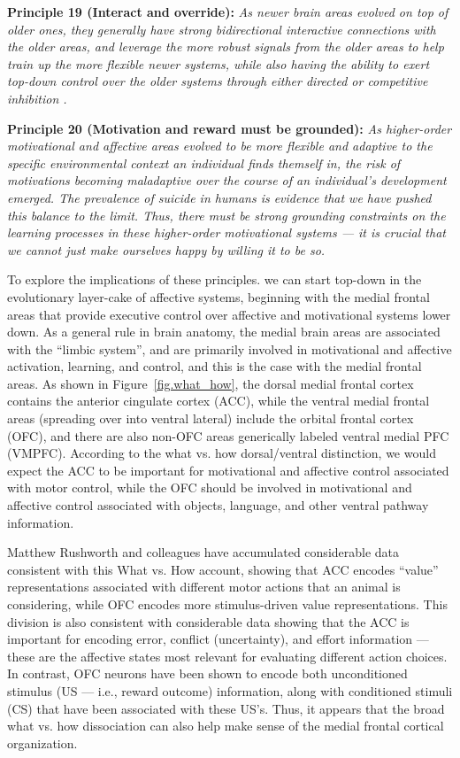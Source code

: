 \documentclass[11pt,twoside]{article}
\begin{document}
{\bf Principle 19 (Interact and override):} {\em As newer brain areas evolved
  on top of older ones, they generally have strong bidirectional interactive
  connections with the older areas, and leverage the more robust signals from
  the older areas to help train up the more flexible newer systems, while also
  having the ability to exert top-down control over the older systems through
  either directed or competitive inhibition \cite{MunakataHerdChathamEtAl11}.}

{\bf Principle 20 (Motivation and reward must be grounded):} {\em As
  higher-order motivational and affective areas evolved to be more flexible
  and adaptive to the specific environmental context an individual finds
  themself in, the risk of motivations becoming maladaptive over the course of
  an individual's development emerged.  The prevalence of suicide in humans is
  evidence that we have pushed this balance to the limit.  Thus, there must be
  strong grounding constraints on the learning processes in these higher-order
  motivational systems --- it is crucial that we cannot just make ourselves
  happy by willing it to be so.}

To explore the implications of these principles. we can start top-down in the
evolutionary layer-cake of affective systems, beginning with the medial
frontal areas that provide executive control over affective and motivational
systems lower down.  As a general rule in brain anatomy, the medial brain
areas are associated with the ``limbic system'', and are primarily involved in
motivational and affective activation, learning, and control, and this is the
case with the medial frontal areas.  As shown in Figure~\ref{fig.what_how},
the dorsal medial frontal cortex contains the anterior cingulate cortex (ACC),
while the ventral medial frontal areas (spreading over into ventral lateral)
include the orbital frontal cortex (OFC), and there are also non-OFC areas
generically labeled ventral medial PFC (VMPFC).  According to the what vs. how
dorsal/ventral distinction, we would expect the ACC to be important for
motivational and affective control associated with motor control, while the
OFC should be involved in motivational and affective control associated with
objects, language, and other ventral pathway information.

Matthew Rushworth and colleagues have accumulated considerable data consistent
with this What vs. How account, showing that ACC encodes ``value''
representations associated with different motor actions that an animal is
considering, while OFC encodes more stimulus-driven value representations.
This division is also consistent with considerable data showing that the ACC
is important for encoding error, conflict (uncertainty), and effort
information --- these are the affective states most relevant for evaluating
different action choices.  In contrast, OFC neurons have been shown to encode
both unconditioned stimulus (US --- i.e., reward outcome) information, along
with conditioned stimuli (CS) that have been associated with these US's.
Thus, it appears that the broad what vs. how dissociation can also help make
sense of the medial frontal cortical organization.
\end{document}
